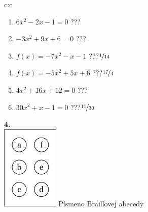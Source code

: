 \documentclass[10pt]{report}
\begin{document}
\begin{tabular}{c:c}
\begin{minipage}[c][104.5mm][t]{0.5\linewidth}
\begin{center}
\begin{minipage}{0.79\linewidth}
\begin{center}
\begin{varwidth}{\linewidth}
\begin{enumerate}
\Large
\item $6x^2-2x-1=0$\quad \dotfill\; ???\;\dotfill {}
\item $-3x^2+9x+6=0$\quad \dotfill\; ???\;\dotfill {}
\item $f(x)=-7x^2-x-1$\quad \dotfill\; ???\;\dotfill \quad $\nicefrac{1}{14}$
\item $f(x)=-5x^2+5x+6$\quad \dotfill\; ???\;\dotfill \quad $\nicefrac{17}{4}$
\item $4x^2+16x+12=0$\quad \dotfill\; ???\;\dotfill {}
\item $30x^2+x-1=0$\quad \dotfill\; ???\;\dotfill \quad $\nicefrac{11}{30}$
\end{enumerate}
\end{varwidth}
\end{center}
\end{minipage}
\begin{minipage}{0.20\linewidth}
\begin{center}
{\Huge\bfseries 4.} \\[2mm]
\includegraphics[height=40mm]{../images/braille.png}
{\small Písmeno Braillovej abecedy}
\end{center}
\end{minipage}
\end{center}
\end{minipage}
%
\end{tabular}
\newpage
\thispagestyle{empty}
\end{document}
